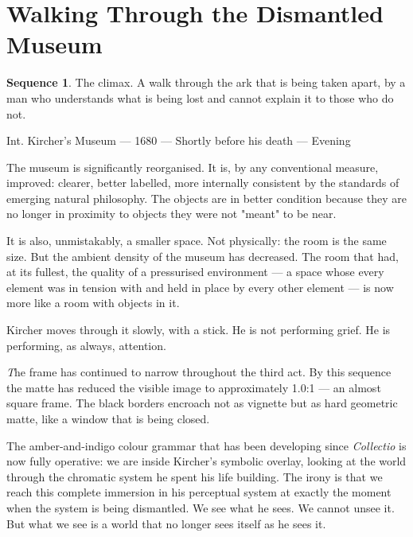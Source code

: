 \documentclass[12pt, a4paper, twoside]{memoir}
\theoremstyle{definition}
\newtheorem{sequence}{Sequence}[chapter]
\theoremstyle{remark}
\newenvironment{sceneheading}{%
  \vspace{8pt}%
  \noindent\begin{mdframed}[
    linecolor=arkgold,
    linewidth=0.8pt,
    leftmargin=0pt,
    rightmargin=0pt,
    innerleftmargin=6pt,
    innerrightmargin=6pt,
    innertopmargin=4pt,
    innerbottommargin=4pt,
    backgroundcolor=arkgold!6
  ]%
  \noindent\textsc\bgroup\small
}{%
  \egroup\end{mdframed}\vspace{4pt}%
}
\newenvironment{action}{%
  \vspace{4pt}%
  \noindent\begin{minipage}{\linewidth}%
  \setlength{\parindent}{0pt}%
  \itshape\color{kircherink}%
}{%
  \end{minipage}\vspace{6pt}%
}
\newenvironment{visual}{%
  \vspace{6pt}%
  \noindent\begin{mdframed}[
    linecolor=plaguegrey,
    linewidth=0.4pt,
    leftline=true, rightline=false, topline=false, bottomline=false,
    innerleftmargin=8pt,
    innerrightmargin=0pt,
    innertopmargin=2pt,
    innerbottommargin=2pt,
    backgroundcolor=white
  ]%
  \footnotesize\color{plaguegrey}\textit
}{%
  \end{mdframed}\vspace{4pt}%
}
\begin{document}
\clearpage

\section{Walking Through the Dismantled Museum}

\begin{sequence}
\label{seq:final-walk}
The climax. A walk through the ark that is being taken apart, by a man who understands what is being lost and cannot explain it to those who do not.
\end{sequence}

\begin{sceneheading}
Int. Kircher's Museum --- 1680 --- Shortly before his death --- Evening
\end{sceneheading}

\begin{action}
The museum is significantly reorganised. It is, by any conventional measure, improved: clearer, better labelled, more internally consistent by the standards of emerging natural philosophy. The objects are in better condition because they are no longer in proximity to objects they were not "meant" to be near.

It is also, unmistakably, a smaller space. Not physically: the room is the same size. But the ambient density of the museum has decreased. The room that had, at its fullest, the quality of a pressurised environment --- a space whose every element was in tension with and held in place by every other element --- is now more like a room with objects in it.

Kircher moves through it slowly, with a stick. He is not performing grief. He is performing, as always, attention.
\end{action}

\begin{visual}
The frame has continued to narrow throughout the third act. By this sequence the matte has reduced the visible image to approximately 1.0:1 --- an almost square frame. The black borders encroach not as vignette but as hard geometric matte, like a window that is being closed.

The amber-and-indigo colour grammar that has been developing since \textit{Collectio} is now fully operative: we are inside Kircher's symbolic overlay, looking at the world through the chromatic system he spent his life building. The irony is that we reach this complete immersion in his perceptual system at exactly the moment when the system is being dismantled. We see what he sees. We cannot unsee it. But what we see is a world that no longer sees itself as he sees it.
\end{visual}
\end{document}
